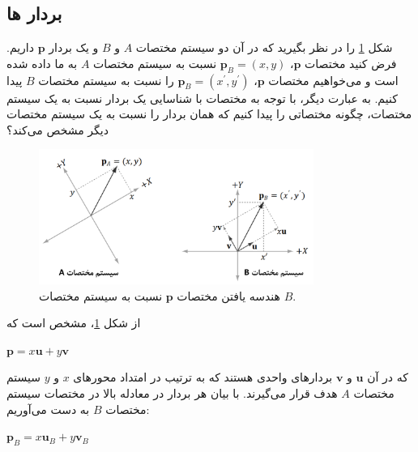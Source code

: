 \subsection{\textbf{بردار ها}}
\label{subsec:3.4.1}
{
    \Large
    \begin{spacing}{1.5}
        شکل \ref{fig:4.Session.1.3.11} را در نظر بگیرید که در آن دو سیستم مختصات $A$ و $B$ و یک بردار $\textbf{p}$ داریم.
        فرض کنید مختصات $\textbf{p}$، $\textbf{p}_{B}=(x, y)$ نسبت به سیستم مختصات $A$ به ما داده شده است
        و می‌خواهیم مختصات $\textbf{p}$، $\textbf{p}_{B}=(x^\prime, y^\prime)$ را نسبت به سیستم مختصات $B$ پیدا کنیم.
        به عبارت دیگر، با توجه به مختصات با شناسایی یک بردار نسبت به یک سیستم مختصات، چگونه مختصاتی را پیدا کنیم که همان بردار را نسبت به یک سیستم مختصات دیگر مشخص می‌کند؟

        \begin{figure}[H]
            \centering
            \setlength{\belowcaptionskip}{-10pt}
            \includegraphics[width=0.8\textwidth]{Images/4/3/4.Session.1.3.11}
            \caption {هندسه یافتن مختصات $\textbf{p}$ نسبت به سیستم مختصات $B$.}
            \label{fig:4.Session.1.3.11}
        \end{figure}

        از شکل \ref{fig:4.Session.1.3.11}، مشخص است که

        \begin{center}
            $\textbf{p}=x\textbf{u}+y\textbf{v}$
        \end{center}

        که در آن $\textbf{u}$ و $\textbf{v}$ بردارهای واحدی هستند که به ترتیب در امتداد محورهای $x$ و $y$ سیستم مختصات $A$ هدف قرار می‌گیرند.
        با بیان هر بردار در معادله بالا در مختصات سیستم مختصات $B$ به دست می‌آوریم:

        \begin{center}
            $\textbf{p}_{B}=x\textbf{u}_{B}+y\textbf{v}_{B}$
        \end{center}


\end{spacing}}
